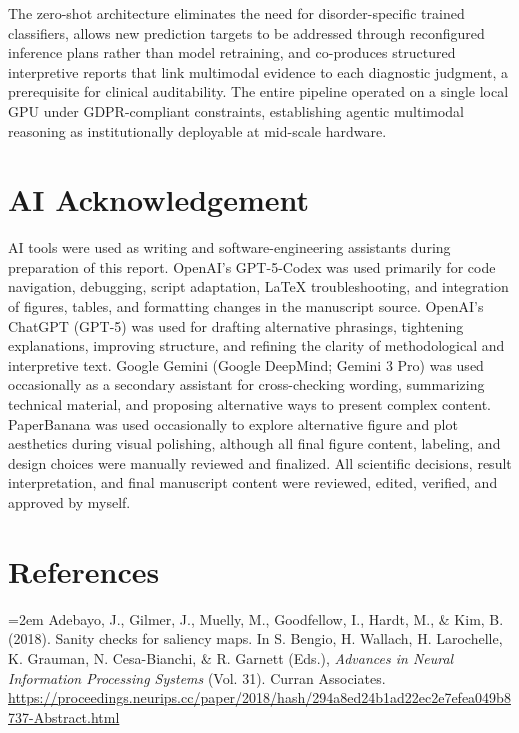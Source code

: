 \documentclass[11pt,a4paper,twoside]{article}
\begin{document}
The zero-shot architecture eliminates the need for disorder-specific trained classifiers, allows new prediction targets to be addressed through reconfigured inference plans rather than model retraining, and co-produces structured interpretive reports that link multimodal evidence to each diagnostic judgment, a prerequisite for clinical auditability. The entire pipeline operated on a single local GPU under GDPR-compliant constraints, establishing agentic multimodal reasoning as institutionally deployable at mid-scale hardware.

\clearpage
\section*{AI Acknowledgement}
AI tools were used as writing and software-engineering assistants during preparation of this report. OpenAI's GPT-5-Codex was used primarily for code navigation, debugging, script adaptation, LaTeX troubleshooting, and integration of figures, tables, and formatting changes in the manuscript source. OpenAI's ChatGPT (GPT-5) was used for drafting alternative phrasings, tightening explanations, improving structure, and refining the clarity of methodological and interpretive text. Google Gemini (Google DeepMind; Gemini 3 Pro) was used occasionally as a secondary assistant for cross-checking wording, summarizing technical material, and proposing alternative ways to present complex content. PaperBanana was used occasionally to explore alternative figure and plot aesthetics during visual polishing, although all final figure content, labeling, and design choices were manually reviewed and finalized. All scientific decisions, result interpretation, and final manuscript content were reviewed, edited, verified, and approved by myself.

\clearpage
\section*{References}
\begingroup
\small
\setlength{\parindent}{0pt}
\setlength{\parskip}{4pt plus 1pt minus 1pt}

\hangindent=2em Adebayo, J., Gilmer, J., Muelly, M., Goodfellow, I., Hardt, M., \& Kim, B. (2018). Sanity checks for saliency maps. In S. Bengio, H. Wallach, H. Larochelle, K. Grauman, N. Cesa-Bianchi, \& R. Garnett (Eds.), \textit{Advances in Neural Information Processing Systems} (Vol. 31). Curran Associates. \url{https://proceedings.neurips.cc/paper/2018/hash/294a8ed24b1ad22ec2e7efea049b8737-Abstract.html}
\end{document}
